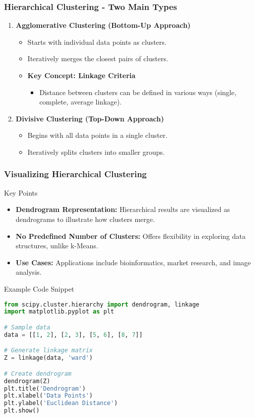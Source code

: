 \documentclass[aspectratio=169]{beamer}
\begin{document}
\begin{frame}[fragile]
    \frametitle{Hierarchical Clustering - Two Main Types}
    \begin{enumerate}
        \item \textbf{Agglomerative Clustering (Bottom-Up Approach)}
        \begin{itemize}
            \item Starts with individual data points as clusters.
            \item Iteratively merges the closest pairs of clusters.
            \item \textbf{Key Concept: Linkage Criteria}
            \begin{itemize}
                \item Distance between clusters can be defined in various ways (single, complete, average linkage).
            \end{itemize}
        \end{itemize}
        
        \item \textbf{Divisive Clustering (Top-Down Approach)}
        \begin{itemize}
            \item Begins with all data points in a single cluster.
            \item Iteratively splits clusters into smaller groups.
        \end{itemize}
    \end{enumerate}
\end{frame}

\begin{frame}[fragile]
    \frametitle{Visualizing Hierarchical Clustering}
    \begin{block}{Key Points}
        \begin{itemize}
            \item \textbf{Dendrogram Representation:} Hierarchical results are visualized as dendrograms to illustrate how clusters merge.
            \item \textbf{No Predefined Number of Clusters:} Offers flexibility in exploring data structures, unlike k-Means.
            \item \textbf{Use Cases:} Applications include bioinformatics, market research, and image analysis.
        \end{itemize}
    \end{block}

    \begin{block}{Example Code Snippet}
        \begin{lstlisting}[language=Python]
from scipy.cluster.hierarchy import dendrogram, linkage
import matplotlib.pyplot as plt

# Sample data
data = [[1, 2], [2, 3], [5, 6], [8, 7]]

# Generate linkage matrix
Z = linkage(data, 'ward')

# Create dendrogram
dendrogram(Z)
plt.title('Dendrogram')
plt.xlabel('Data Points')
plt.ylabel('Euclidean Distance')
plt.show()
        \end{lstlisting}
    \end{block}
\end{frame}
\end{document}

